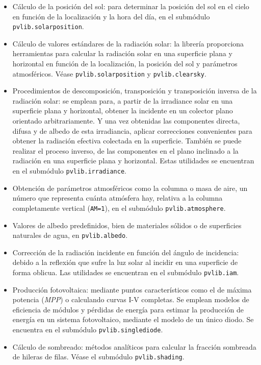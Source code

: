 \begin{itemize}
      \item Cálculo de la posición del sol: para determinar la posición del sol en el cielo en función de la localización y la hora del día, en el submódulo \texttt{pvlib.solarposition}.
      \item Cálculo de valores estándares de la radiación solar: la librería proporciona herramientas para calcular la radiación solar en una superficie plana y horizontal en función de la localización, la posición del sol y parámetros atmosféricos. Véase \texttt{pvlib.solarposition} y \texttt{pvlib.clearsky}.
      \item Procedimientos de descomposición, transposición y transposición inversa de la radiación solar: se emplean para, a partir de la irradiance solar en una superficie plana y horizontal, obtener la incidente en un colector plano orientado arbitrariamente. Y una vez obtenidas las componentes directa, difusa y de albedo de esta irradiancia, aplicar correcciones convenientes para obtener la radiación efectiva colectada en la superficie. También se puede realizar el proceso inverso, de las componentes en el plano inclinado a la radiación en una superficie plana y horizontal. Estas utilidades se encuentran en el submódulo \texttt{pvlib.irradiance}.
      \item Obtención de parámetros atmosféricos como la columna o masa de aire, un número que representa cuánta atmósfera hay, relativa a la columna completamente vertical (\texttt{AM=1}), en el submódulo \texttt{pvlib.atmosphere}.
      \item Valores de albedo predefinidos, bien de materiales sólidos o de superficies naturales de agua, en \texttt{pvlib.albedo}.
      \item Corrección de la radiación incidente en función del ángulo de incidencia: debido a la reflexión que sufre la luz solar al incidir en una superficie de forma oblicua. Las utilidades se encuentran en el submódulo \texttt{pvlib.iam}.
      \item Producción fotovoltaica: mediante puntos característicos como el de máxima potencia (\textit{MPP}) o calculando curvas I-V completas. Se emplean modelos de eficiencia de módulos y pérdidas de energía para estimar la producción de energía en un sistema fotovoltaico, mediante el modelo de un único diodo. Se encuentra en el submódulo \texttt{pvlib.singlediode}.
      \item Cálculo de sombreado: métodos analíticos para calcular la fracción sombreada de hileras de filas. Véase el submódulo \texttt{pvlib.shading}.

\end{itemize}
